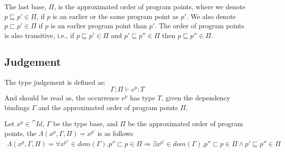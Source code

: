 \documentclass[../../master.tex]{subfiles}
\begin{document}
The last base, $\Pi$, is the approximated order of program points, where we denote $p\sqsubseteq p'\in\Pi$, if $p$ is an earlier or the same program point as $p'$.
We also denote $p \sqsubset p'\in\Pi$ if $p$ is an earlier program point than $p'$.
The order of program points is also transitive, i.e., if $p\sqsubseteq p'\in\Pi$ and $p'\sqsubseteq p''\in\Pi$ then $p\sqsubseteq p''\in\Pi$.


\subsection{Judgement}
The type judgement is defined as:
$$\Gamma;\Pi\vdash e^p: T$$
And should be read as, the occurrence $e^p$ has type $T$, given the dependency bindings $\Gamma$ and the approximated order of program points $\Pi$.

\begin{definition}
	Let $x^p\in \cat{Id}$, $\Gamma$ be the type base, and $\Pi$ be the approximated order of program points, the $\Lambda(x^p,\Gamma,\Pi)=x^{p'}$ is as follows
	\begin{align*}
		\Lambda(x^p,\Gamma,\Pi)=\forall x^{p''}\in dom(\Gamma). p''\sqsubset p\in\Pi\Rightarrow \exists x^{p'}\in dom(\Gamma).p''\sqsubset p\in\Pi\wedge p'\sqsubseteq p''\in\Pi
	\end{align*}
\end{definition}



\begin{landscape}

\end{landscape}
\end{document}
